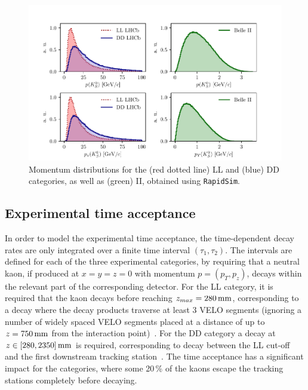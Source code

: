 \begin{figure}[tbp]
    \centering
    \includegraphics[width=0.95\columnwidth]{figures/ks_chapter/momentum_distributions.pdf}
    \caption{Momentum distributions for the \lhcb (red dotted line) LL and (blue) DD categories, as well as (green) \belle II, obtained using \texttt{RapidSim}.}
    \label{fig:momentum}
\end{figure}



\subsection{Experimental time acceptance} %
\label{sub:experimental_time_acceptance}

In order to model the experimental time acceptance, the time-dependent decay rates are only integrated over a finite time interval $(\tau_1, \tau_2)$. The intervals are defined for each of the three experimental categories, by requiring that a neutral kaon, if produced at $x=y=z=0$ with momentum $p=(p_T, p_z)$, decays within the relevant part of the corresponding detector. For the LL \lhcb category, it is required that the kaon decays before reaching $z_{max}=280\text{\,mm}$, corresponding to a decay where the decay products traverse at least 3 VELO segments (ignoring a number of widely spaced VELO segments placed at a distance of up to $z=750\text{\,mm}$ from the interaction point)~\cite{CERN-LHCC-2003-030}. For the DD \lhcb category a decay at $z\in[280,2350]\text{\,mm}$ is required, corresponding to decay between the LL cut-off and the first downstream tracking station~\cite{LHCb-2003-140}. 
The time acceptance has a significant impact for the \lhcb categories, where some 20\,\% of the kaons escape the tracking stations completely before decaying.

